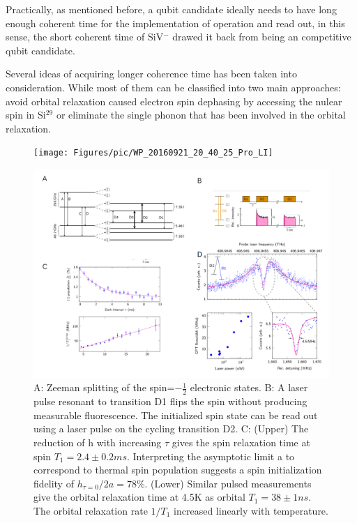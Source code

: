 Practically, as mentioned before, a qubit candidate ideally needs to have long enough coherent time for the implementation of operation and read out, in this sense, the short coherent time of SiV$^{-}$ drawed it back from being an competitive qubit candidate. 

Several ideas of acquiring longer coherence time has been taken into consideration. While most of them can be classified into two main approaches: avoid orbital relaxation caused electron spin dephasing by accessing the nulear spin in Si$^{29}$ \citep{dietrich_isotopically_2014}  or eliminate the single phonon that has been involved in the orbital relaxation.

\begin{figure}[h]
\centering
\texttt{[image: Figures/pic/WP\_20160921\_20\_40\_25\_Pro\_LI]}
\caption{}
\label{fig:wp20160921204025proli}
\end{figure}

\begin{figure}[h]
\centering
\includegraphics[width=1\linewidth]{Figures/pic/coherent}
\caption{A: Zeeman splitting of the spin=$-\frac{1}{2}$ electronic states. B: A laser pulse resonant to transition D1 flips the spin without producing measurable fluorescence. The initialized spin state can be read out using a laser pulse on the cycling transition D2. C: (Upper) The reduction of h with increasing $\tau$ gives the spin relaxation time at spin $T_{1} = 2.4 \pm 0.2ms$. Interpreting the asymptotic limit a to correspond to thermal spin population suggests a spin initialization fidelity of $h_{\tau=0}/2a = 78\%$. (Lower) Similar pulsed measurements give the orbital relaxation time at 4.5K as orbital $T_{1} = 38\pm1ns$. The orbital relaxation rate $1/T_{1}$ increased linearly with temperature.}
\label{fig:CPT}
\end{figure}

